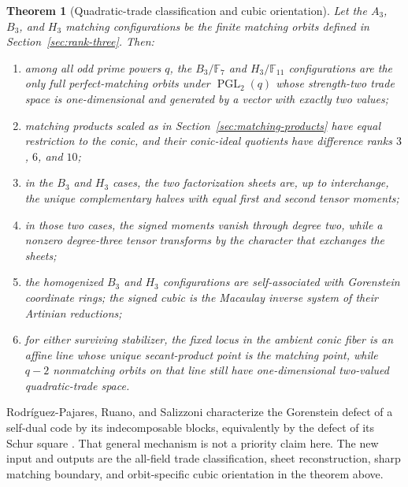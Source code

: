 \documentclass[11pt]{article}
\newtheorem{theorem}{Theorem}[section]
\theoremstyle{definition}
\theoremstyle{remark}
\newcommand{\F}{\mathbb{F}}
\begin{document}
\begin{theorem}[Quadratic-trade classification and cubic orientation]
\label{thm:factorization-recovery}
Let the $A_3$, $B_3$, and $H_3$ matching configurations be the finite
matching orbits defined in Section~\ref{sec:rank-three}.  Then:
\begin{enumerate}[label=\textup{(\roman*)},leftmargin=*]
\item among all odd prime powers \(q\), the \(B_3/\F_7\) and
\(H_3/\F_{11}\) configurations are the only full perfect-matching
orbits under \(\operatorname{PGL}_2(q)\) whose
strength-two trade space is
one-dimensional and generated by a vector with exactly two values;
\item matching products scaled as in Section~\ref{sec:matching-products}
have equal restriction to the conic, and their conic-ideal quotients have
difference ranks $3$, $6$, and $10$;
\item in the $B_3$ and $H_3$ cases, the two factorization sheets are,
up to interchange, the unique complementary halves with equal first and
second tensor moments;
\item in those two cases, the signed moments vanish through degree two,
while a nonzero degree-three tensor transforms by the character that
exchanges the sheets;
\item the homogenized \(B_3\) and \(H_3\) configurations are
self-associated with Gorenstein coordinate rings; the signed cubic is
the Macaulay inverse system of their Artinian reductions;
\item for either surviving stabilizer, the fixed locus in the ambient
conic fiber is an affine line whose unique secant-product point is the
matching point, while \(q-2\) nonmatching orbits on that line still have
one-dimensional two-valued quadratic-trade space.
\end{enumerate}
\end{theorem}

Rodr\'iguez-Pajares, Ruano, and Salizzoni characterize the Gorenstein defect
of a self-dual code by its indecomposable blocks, equivalently by the defect of
its Schur square
\cite[Theorem~3.11 and Corollaries~3.12--3.13]{RodriguezPajaresEtAl2025}.
That general mechanism is not a priority claim here.  The new input and
outputs are the all-field trade classification, sheet reconstruction, sharp
matching boundary, and orbit-specific cubic orientation in the theorem above.
\end{document}
